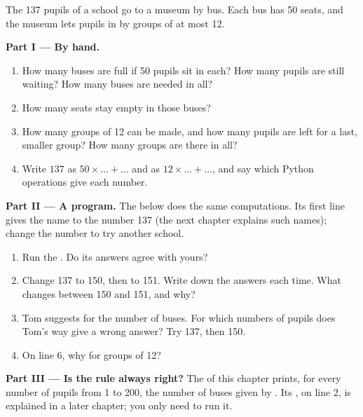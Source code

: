 \begin{problem}\label{pb:g6:first-python-program:1}
The 137 pupils of a school go to a museum by bus. Each bus has 50 seats, and the
museum lets pupils in by groups of at most 12.

\medskip\noindent\textbf{Part I --- By hand.}
\begin{enumerate}
  \item How many buses are full if 50 pupils sit in each? How many pupils are
    still waiting? How many buses are needed in all?
  \item How many seats stay empty in those buses?
  \item How many groups of 12 can be made, and how many pupils are left for a
    last, smaller group? How many groups are there in all?
  \item Write $137$ as $50 \times \dots + \dots$ and as $12 \times \dots +
    \dots$, and say which Python operations give each number.
\end{enumerate}

\medskip\noindent\textbf{Part II --- A program.} The  below does the same
computations. Its first line gives the name  to the number 137
(the next chapter explains such names); change the number to try another
school.

\label{lst:g6:first-python-program:trip}

\begin{enumerate}[resume]
  \item Run the . Do its answers agree with yours?
  \item Change 137 to 150, then to 151. Write down the answers each time. What
    changes between 150 and 151, and why?
  \item Tom suggests  for the number of buses. For which
    numbers of pupils does Tom's way give a wrong answer? Try 137, then 150.
  \item On line 6, why  for groups of 12?
\end{enumerate}

\medskip\noindent\textbf{Part III --- Is the rule always right?} The 
 of this chapter prints, for every number of pupils from 1
to 200, the number of buses given by . Its , on
line 2, is explained in a later chapter; you only need to run it.


\end{problem}

